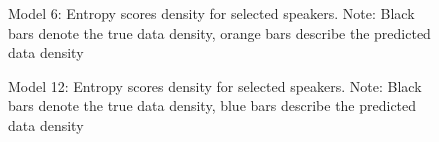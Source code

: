 \documentclass[
sn-apacite
]{sn-jnl}
\begin{document}
\label{cell-fig-rq3-pred-speaker_model06}
\begin{figure}[H]


\caption{\label{fig-rq3-pred-speaker_model06}Model 6: Entropy scores
density for selected speakers. Note: Black bars denote the true data
density, orange bars describe the predicted data density}

\end{figure}%

\label{cell-fig-rq3-pred-speaker_model12}
\begin{figure}[H]


\caption{\label{fig-rq3-pred-speaker_model12}Model 12: Entropy scores
density for selected speakers. Note: Black bars denote the true data
density, blue bars describe the predicted data density}

\end{figure}%
\end{document}
